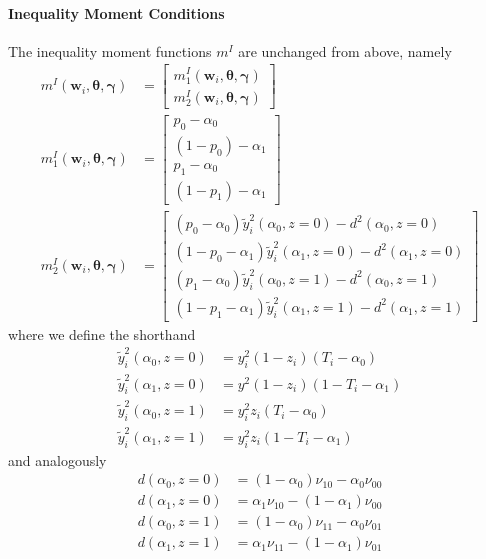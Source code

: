 \documentclass[12pt]{article}
\begin{document}
\paragraph{Inequality Moment Conditions}
The inequality moment functions $m^I$ are unchanged from above, namely
\begin{align*}
  m^I(\mathbf{w}_i, \boldsymbol{\theta}, \boldsymbol{\gamma}) &=
  \left[
  \begin{array}{l}
    m_1^I(\mathbf{w}_i, \boldsymbol{\theta}, \boldsymbol{\gamma}) \\ 
    m_2^I(\mathbf{w}_i, \boldsymbol{\theta}, \boldsymbol{\gamma}) 
  \end{array}
\right] \\
m_1^I(\mathbf{w}_i, \boldsymbol{\theta}, \boldsymbol{\gamma}) &=
  \left[
  \begin{array}{r}
  p_0 - \alpha_0 \\
  (1 - p_0) - \alpha_1  \\
  p_1 - \alpha_0 \\
  (1 - p_1) - \alpha_1  
  \end{array}
\right]\\
m_2^I(\mathbf{w}_i, \boldsymbol{\theta}, \boldsymbol{\gamma}) &=
\left[
\begin{array}{r}
  (p_0 - \alpha_0) \widetilde{y}_i^2(\alpha_0,z=0) - d^2(\alpha_0,z=0)\\
  (1- p_0 - \alpha_1) \widetilde{y}^2_i(\alpha_1,z=0) - d^2(\alpha_1,z=0)\\
  (p_1 - \alpha_0) \widetilde{y}^2_i(\alpha_0,z=1) - d^2(\alpha_0,z=1)\\
  (1- p_1 - \alpha_1) \widetilde{y}_i^2(\alpha_1,z=1) -  d^2(\alpha_1,z=1)
\end{array}
\right]
\end{align*}
where we define the shorthand
\begin{align*}
  \widetilde{y}_i^2(\alpha_0, z=0) &= y_i^2 (1 - z_i)(T_i - \alpha_0)\\ 
  \widetilde{y}_i^2(\alpha_1, z=0) &= y^2 (1-z_i)(1 - T_i - \alpha_1) \\
  \widetilde{y}_i^2(\alpha_0, z=1) &= y^2_i z_i(T_i - \alpha_0) \\
  \widetilde{y}_i^2(\alpha_1, z=1) &= y_i^2 z_i(1 - T_i - \alpha_1)
\end{align*}
and analogously
\begin{align*}
  d(\alpha_0,z=0) &=(1 - \alpha_0) \nu_{10} - \alpha_0 \nu_{00} \\ 
  d(\alpha_1, z=0) &=\alpha_1 \nu_{10} - (1 - \alpha_1)\nu_{00} \\
  d(\alpha_0, z=1) &=(1 - \alpha_0) \nu_{11} - \alpha_0 \nu_{01} \\
  d(\alpha_1, z=1) &=\alpha_1 \nu_{11} - (1 - \alpha_1)\nu_{01}
\end{align*}
\end{document}
